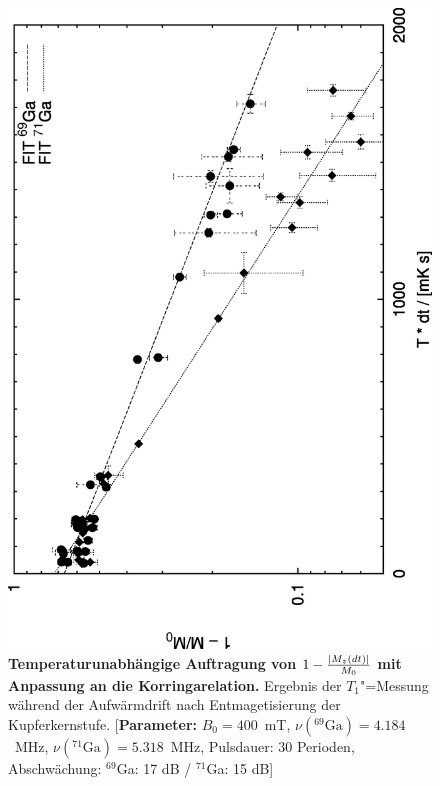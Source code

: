 \begin{figure}
	\begin{center}
			\includegraphics[angle=-90,width=\bigwidth]{plots/t1_aug1197da_3}
	\end{center}
	\caption[Temperaturunabhängige Auftragung von $1 -\frac{\abs{M_z(dt)}}{M_0}$ mit Anpassung an
		die Korringarelation.]{{\upshape\bfseries Temperaturunabhängige Auftragung von $1 -
		\frac{\abs{M_z(dt)}}{M_0}$ mit Anpassung an die Korringarelation.} Ergebnis der $T_1$"=Messung
		während der Aufwärmdrift nach Entmagetisierung der Kupferkernstufe. [{\bfseries Parameter:}  $B_0=400$~mT,
		$\nu(^{69}\mathrm{Ga})=4.184$~MHz, $\nu(^{71}\mathrm{Ga})=5.318$~MHz, Pulsdauer: 30
		Perioden, Abschwächung: $^{69}$Ga: 17 dB / $^{71}$Ga: 15 dB]}
	\label{fig:t1plotTdt}
\end{figure}

